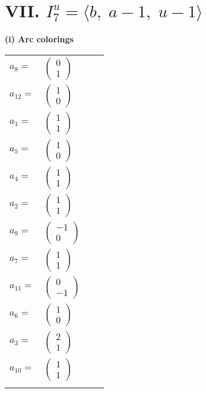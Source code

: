 \documentclass[1p]{elsarticle_modified}
\theoremstyle{definition}
\begin{document}
\centering \section*{VII. $I^u_{7}= \langle b,\;a-1,\;u-1 \rangle$}
\flushleft \textbf{(i) Arc colorings}\\
\begin{tabular}{m{7pt} m{180pt} m{7pt} m{180pt} }
\flushright $a_{8}=$&$\begin{pmatrix}0\\1\end{pmatrix}$ \\
\flushright $a_{12}=$&$\begin{pmatrix}1\\0\end{pmatrix}$ \\
\flushright $a_{1}=$&$\begin{pmatrix}1\\1\end{pmatrix}$ \\
\flushright $a_{5}=$&$\begin{pmatrix}1\\0\end{pmatrix}$ \\
\flushright $a_{4}=$&$\begin{pmatrix}1\\1\end{pmatrix}$ \\
\flushright $a_{2}=$&$\begin{pmatrix}1\\1\end{pmatrix}$ \\
\flushright $a_{9}=$&$\begin{pmatrix}-1\\0\end{pmatrix}$ \\
\flushright $a_{7}=$&$\begin{pmatrix}1\\1\end{pmatrix}$ \\
\flushright $a_{11}=$&$\begin{pmatrix}0\\-1\end{pmatrix}$ \\
\flushright $a_{6}=$&$\begin{pmatrix}1\\0\end{pmatrix}$ \\
\flushright $a_{3}=$&$\begin{pmatrix}2\\1\end{pmatrix}$ \\
\flushright $a_{10}=$&$\begin{pmatrix}1\\1\end{pmatrix}$\\&\end{tabular}
\end{document}

